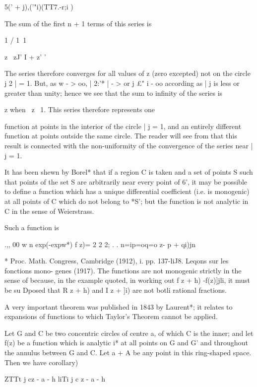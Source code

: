 {{5(' + j)\!,('"i)(TT7.-r;i )

The sum of the first n + 1 terms of this series is

1 / 1\ 1

z \ zJ' I + z' '

The series therefore converges for all values of z (zero excepted) not
on the circle j 2 | = 1. But, as w - > oo, | 2:'* | - > or j £" i -
oo according as | j is less or greater than unity; hence we see that
the sum to infinity of the series is

z when \ z\ < 1, and - when | j > 1. This series therefore represents
one

function at points in the interior of the circle | j = 1, and an
entirely different function at points outside the same circle. The
reader will see from  that this result is connected with the
non-uniformity of the convergence of the series near | j = 1.

It has been shewn by Borel* that if a region C is taken and a set of
points S such that points of the set S are arbitrarily near every
point of 6', it may be possible to define a function which has a
unique differential coefficient (i.e. is monogenic) at all points of C
which do not belong to *S'; but the function is not analytic in C in
the sense of Weierstrass.

Such a function is

.,, 00 w n exp(-expw*) f z)= 2 2 2; . . n=ip=oq=o z- p + qi)jn

* Proc. Math. Congress, Cambridge (1912), i. pp. 137-liJ8. Leqons sur
les fonctions mono- genes (1917). The functions are not monogenic
strictly in the sense of  because, in the example quoted, in
working out f z + h) -f(z)]jli, it must be su Dposed that R z + h) and
I z + ]i) are not botli rational fractions.

%
%


A very important theorem was published in 1843 by Laurent*; it
relates to expansions of functions to which Taylor's Theorem cannot be
applied.

Let G and C be two concentric circles of centre a, of which C is the
inner; and let f(z) be a function which is analytic i* at all points
on G and G' and throughout the annulus between G and C. Let a + A be
any point in this ring-shaped space. Then we have  corollary)

 ZTTt j cz - a - h liTi j c z - a - h

}}
